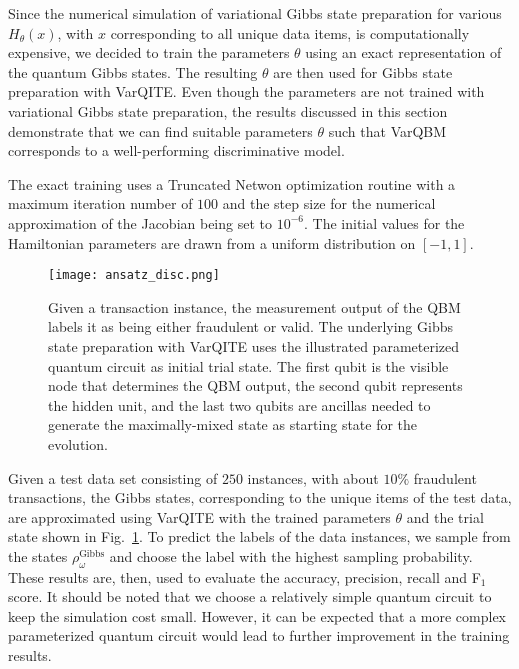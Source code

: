 \documentclass[twocolumn, aps, pra, superscriptaddress, floatfix]{revtex4}
\newcommand{\varqbm}{VarQBM}
\begin{document}
Since the numerical simulation of variational Gibbs state preparation for various $H_{\theta}\left( x\right)$, with $x$ corresponding to all unique data items, is computationally expensive, we decided to train the parameters $\theta$ using an exact representation of the quantum Gibbs states.
The resulting $\theta$ are then used for Gibbs state preparation with VarQITE.
Even though the parameters are not trained with variational Gibbs state preparation, the results discussed in this section demonstrate that we can find suitable parameters $\theta$ such that \varqbm{} corresponds to a well-performing discriminative model.

The exact training uses a Truncated Netwon optimization routine \cite{TNCDembo1983} with a maximum iteration number of $100$ and the step size for the numerical approximation of the Jacobian being set to $10^{-6}$. 
The initial values for the Hamiltonian parameters are drawn from a uniform distribution on $\left[-1, 1\right]$.
 \begin{figure}[h!]
\captionsetup{singlelinecheck = false, format= hang, justification=raggedright, font=footnotesize, labelsep=space}
\begin{center}
\texttt{[image: ansatz\_disc.png]}
\end{center}
\caption{Given a transaction instance, the measurement output of the QBM labels it as being either fraudulent or valid. The underlying Gibbs state preparation with VarQITE uses the illustrated parameterized quantum circuit as initial trial state. The first qubit is the visible node that determines the QBM output, the second qubit represents the hidden unit, and the last two qubits are ancillas needed to generate the maximally-mixed state as starting state for the evolution.}
\label{fig:ansatz_Disc}
\end{figure}

Given a test data set consisting of $250$ instances, with about $10\%$ fraudulent transactions, the Gibbs states, corresponding to the unique items of the test data, are approximated using VarQITE with the trained parameters $\theta$ and the trial state shown in Fig.~\ref{fig:ansatz_Disc}. 
To predict the labels of the data instances, we sample from the states $\rho_{\omega}^{\text{Gibbs}}$ and choose the label with the highest sampling probability.
These results are, then, used to evaluate the accuracy, precision, recall and F$_1$ score.
It should be noted that we choose a relatively simple quantum circuit to keep the simulation cost small. 
However, it can be expected that a more complex parameterized quantum circuit would lead to further improvement in the training results.
\end{document}
